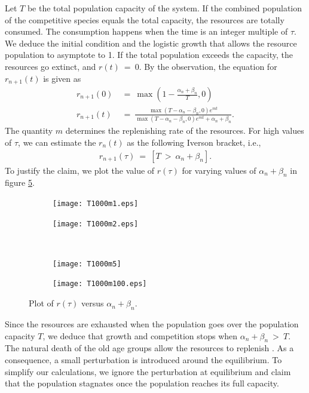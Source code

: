 \documentclass[11pt,reqno]{amsart}
\numberwithin{equation}{section}
\theoremstyle{plain}
\begin{document}
Let $T$ be the total population capacity of the system. If the combined population of the competitive species equals the total capacity, the resources are totally consumed. The consumption happens when the time is an integer multiple of $\tau$. 
We deduce the initial condition and the logistic growth that allows the resource population to asymptote to 1. If the total population exceeds the capacity, the 
resources go extinct, and $r(t) \ = \  0$. By the observation, the equation for $r_{n+1}(t)$ is given as
\begin{align}
    r_{n + 1}(0) & \ = \ \max\left(1 - \frac {\alpha_n + \beta_n} T, 0\right) \\ 
    r_{n + 1}(t) & \ = \ \frac{\max(T - \alpha_n - \beta_n, 0) e^{mt}} {
    \max(T - \alpha_n - \beta_n, 0) e^{mt} + \alpha_n + \beta_n
    }. 
\end{align}
The quantity $m$ determines the replenishing rate of the resources. For high values of $\tau$, we can estimate the $r_n(t)$ as the following Iverson bracket, i.e., 
\begin{align}
    r_{n + 1}(\tau) \ = \ [T \ > \  \alpha_n + \beta_n]. 
\end{align}
To justify the claim, we plot the value of $r(\tau)$ for varying 
values of $\alpha_n+\beta_n$ in figure \ref{fig:rtauplots}. 

\begin{figure}[h]
    \centering
    \begin{subfigure}[b]{0.45\textwidth}
        \texttt{[image: T1000m1.eps]}
        \label{fig:fig1}
    \end{subfigure}
    \hfill
    \begin{subfigure}[b]{0.45\textwidth}
        \texttt{[image: T1000m2.eps]}
        \label{fig:fig2}
    \end{subfigure}
    \
    \begin{subfigure}[b]{0.45\textwidth}
        \texttt{[image: T1000m5]}
        \label{fig:fig3}
    \end{subfigure}
    \hfill
    \begin{subfigure}[b]{0.45\textwidth}
        \texttt{[image: T1000m100.eps]}
        \label{fig:fig4}
    \end{subfigure}
    \caption{Plot of $r(\tau)$ versus $\alpha_n + \beta_n$. }
    \label{fig:rtauplots}
    
\end{figure}

Since the resources are exhausted when the population goes over 
the population capacity $T$, we deduce that growth and competition stops when $\alpha_n + \beta_n \ > \  T$. The natural death of the old age groups allow the resources to replenish \cite{Bag19}. As a consequence, a small perturbation is introduced around the equilibrium. To simplify our calculations, we ignore the perturbation at equilibrium and claim that the population stagnates once the population reaches its full capacity. 
\end{document}
